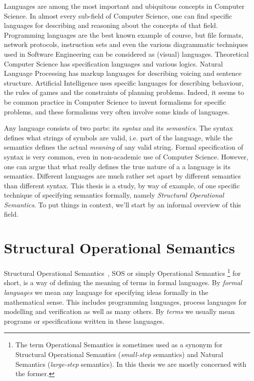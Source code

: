 Languages are among the most important and ubiquitous concepts in Computer Science.
In almost every sub-field of Computer Science, one can find specific languages for
describing and reasoning about the concepts of that field. Programming languages
are the best known example of course, but file formats, network protocols,
instruction sets and even the various diagrammatic techniques used in Software
Engineering can be considered as (visual) languages. Theoretical Computer Science has
specification languages and various logics. Natural Language Processing has markup
languages for describing voicing and sentence structure. Artificial Intelligence
uses specific languages for describing behaviour, the rules of games and the
constraints of planning problems. Indeed, it seems to be common practice in 
Computer Science to invent formalisms for specific problems, and these formalisms
very often involve some kinds of languages.

Any language consists of two parts: its \emph{syntax} and its \emph{semantics}.
The syntax defines what strings of symbols are valid, i.e. part of the language,
while the semantics defines the actual \emph{meaning} of any valid string.
Formal specification of syntax is very common, even in non-academic use of 
Computer Science. However, one can argue that what really 
defines the true nature
of a a language
is its semantics. Different languages are much rather set apart by different
semantics than different syntax.
This thesis is a study, by way of example, of one specific technique of specifying
semantics formally, namely \emph{Structural Operational Semantics}. To put things
in context, we'll start by an informal overview of this field.


\section{Structural Operational Semantics}

Structural Operational Semantics~\cite{Plotkin04a, Plotkin04b},
SOS or simply Operational Semantics
\footnote{The term Operational Semantics is sometimes used as a synonym for
Structural Operational Semantics (\emph{small-step} semantics) and Natural
Semantics (\emph{large-step} semantics). In this thesis we are mostly
concerned with the former.}
for short,
is a way of defining the meaning of terms in formal languages. By
\emph{formal languages} we mean any language for specifying ideas formally in the mathematical
sense. This includes programming languages, process languages for modelling and
verification as well as many others. By \emph{terms} we usually mean programs
or specifications written in these languages.

